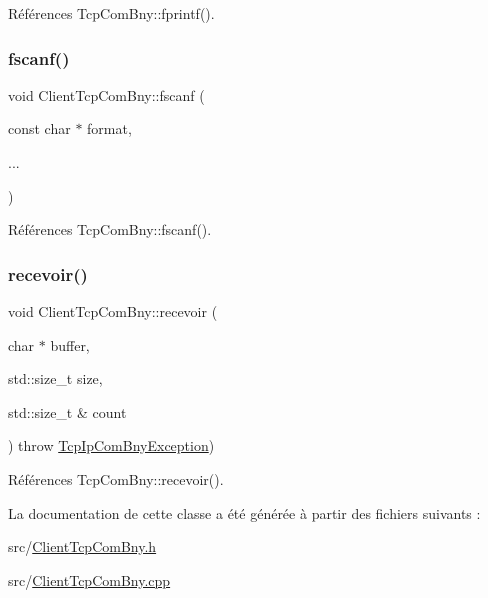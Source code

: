 Références Tcp\+Com\+Bny\+::fprintf().

\mbox{\label{classClientTcpComBny_a0745845f86951740b6839812410608e8}} 
\subsubsection{\texorpdfstring{fscanf()}{fscanf()}}
{\footnotesize\ttfamily void Client\+Tcp\+Com\+Bny\+::fscanf (\begin{DoxyParamCaption}\item[{const char $\ast$}]{format,  }\item[{}]{... }\end{DoxyParamCaption})}



Références Tcp\+Com\+Bny\+::fscanf().

\mbox{\label{classClientTcpComBny_ad32e6a288aeff3d243d88c60afe967c3}} 
\subsubsection{\texorpdfstring{recevoir()}{recevoir()}}
{\footnotesize\ttfamily void Client\+Tcp\+Com\+Bny\+::recevoir (\begin{DoxyParamCaption}\item[{char $\ast$}]{buffer,  }\item[{std\+::size\+\_\+t}]{size,  }\item[{std\+::size\+\_\+t \&}]{count }\end{DoxyParamCaption}) throw  \hyperlink{classTcpIpComBnyException}{Tcp\+Ip\+Com\+Bny\+Exception}) }



Références Tcp\+Com\+Bny\+::recevoir().



La documentation de cette classe a été générée à partir des fichiers suivants \+:\begin{DoxyCompactItemize}
\item 
src/\hyperlink{ClientTcpComBny_8h}{Client\+Tcp\+Com\+Bny.\+h}\item 
src/\hyperlink{ClientTcpComBny_8cpp}{Client\+Tcp\+Com\+Bny.\+cpp}\end{DoxyCompactItemize}
